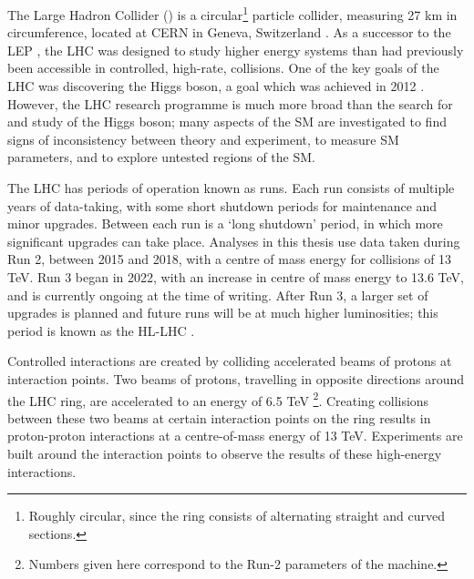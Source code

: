 
The Large Hadron Collider () is a circular\footnote{
  Roughly circular, since the ring consists of alternating straight and curved
  sections.
}
particle collider, measuring 27 km
in circumference, located at \ac{CERN} in Geneva, Switzerland
\cite{LHCVol1,LHCVol2,LHCVol3}.
As a successor to the \ac{LEP} \cite{Assmann2002},
the \ac{LHC} was designed to study higher energy systems than had previously
been accessible in controlled, high-rate, collisions. One of the key goals of
the \ac{LHC} was discovering the Higgs boson, a goal which was achieved in 2012
\cite{Higgs2012a,Higgs2012b,Higgs2013}. However, the \ac{LHC} research programme
is much more broad than the search for and study of the Higgs boson; many aspects of
the \ac{SM} are investigated to find signs of inconsistency between theory and
experiment, to measure \ac{SM} parameters, and to explore untested regions of
the \ac{SM}.

The \ac{LHC} has periods of operation known as runs. Each run consists of
multiple years of data-taking, with some short shutdown periods for maintenance
and minor upgrades. Between each run is a `long shutdown' period, in which more
significant upgrades can take place. Analyses in this thesis use data taken
during Run 2, between 2015 and 2018, with a centre of mass energy for collisions
of 13 TeV. Run 3 began in 2022, with an increase in
centre of mass energy to 13.6 TeV, and is currently ongoing at the time of
writing. After Run 3, a larger set of upgrades is planned and future runs will
be at much higher luminosities; this period is known as the \ac{HL-LHC}
\cite{Aberle2020}.

Controlled interactions are created by colliding accelerated beams of protons at
interaction points.  Two beams of protons, travelling in opposite directions
around the \ac{LHC} ring, are accelerated to an energy of 6.5 TeV \footnote{
  Numbers given here correspond to the Run-2 parameters of the machine.
}.
Creating collisions between these two beams at certain interaction points on the
ring results in proton-proton interactions at a centre-of-mass energy of 13 TeV.
Experiments are built around the interaction points to observe the results of
these high-energy interactions.


